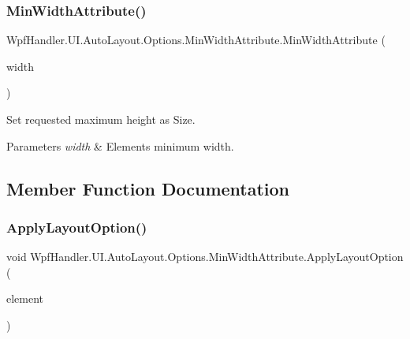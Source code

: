 \subsubsection{\texorpdfstring{Min\+Width\+Attribute()}{MinWidthAttribute()}\hspace{0.1cm}{\footnotesize\ttfamily [2/2]}}
{\footnotesize\ttfamily Wpf\+Handler.\+U\+I.\+Auto\+Layout.\+Options.\+Min\+Width\+Attribute.\+Min\+Width\+Attribute (\begin{DoxyParamCaption}\item[{double}]{width }\end{DoxyParamCaption})}



Set requested maximum height as Size. 


\begin{DoxyParams}{Parameters}
{\em width} & Element\textquotesingle{}s minimum width.\\
\hline
\end{DoxyParams}


\subsection{Member Function Documentation}
\mbox{\label{class_wpf_handler_1_1_u_i_1_1_auto_layout_1_1_options_1_1_min_width_attribute_a22bf72913c8d5d9f958d1edb1b52beda}} 
\subsubsection{\texorpdfstring{Apply\+Layout\+Option()}{ApplyLayoutOption()}}
{\footnotesize\ttfamily void Wpf\+Handler.\+U\+I.\+Auto\+Layout.\+Options.\+Min\+Width\+Attribute.\+Apply\+Layout\+Option (\begin{DoxyParamCaption}\item[{Framework\+Element}]{element }\end{DoxyParamCaption})}



